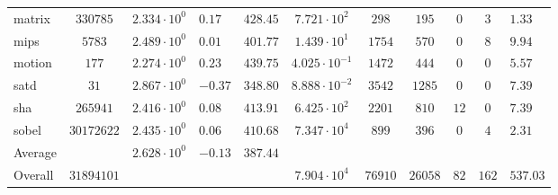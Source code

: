 \begin{tabular}{|l|c|HHc|c|c|c|c|cH|}
matrix        & $ 330785   $ & $ 2.334 \cdot 10^{0} $ & $ 0.17  $ & $ 428.45 $ & $ 7.721 \cdot 10^{2}  $ & $ 298   $ & $ 195   $ & $ 0   $ & $ 3   $ & $ 1.33    $ \\
mips          & $ 5783     $ & $ 2.489 \cdot 10^{0} $ & $ 0.01  $ & $ 401.77 $ & $ 1.439 \cdot 10^{1}  $ & $ 1754  $ & $ 570   $ & $ 0   $ & $ 8   $ & $ 9.94    $ \\
motion        & $ 177      $ & $ 2.274 \cdot 10^{0} $ & $ 0.23  $ & $ 439.75 $ & $ 4.025 \cdot 10^{-1} $ & $ 1472  $ & $ 444   $ & $ 0   $ & $ 0   $ & $ 5.57    $ \\
satd          & $ 31       $ & $ 2.867 \cdot 10^{0} $ & $ -0.37 $ & $ 348.80 $ & $ 8.888 \cdot 10^{-2} $ & $ 3542  $ & $ 1285  $ & $ 0   $ & $ 0   $ & $ 7.39    $ \\
sha           & $ 265941   $ & $ 2.416 \cdot 10^{0} $ & $ 0.08  $ & $ 413.91 $ & $ 6.425 \cdot 10^{2}  $ & $ 2201  $ & $ 810   $ & $ 12  $ & $ 0   $ & $ 7.39    $ \\
sobel         & $ 30172622 $ & $ 2.435 \cdot 10^{0} $ & $ 0.06  $ & $ 410.68 $ & $ 7.347 \cdot 10^{4}  $ & $ 899   $ & $ 396   $ & $ 0   $ & $ 4   $ & $ 2.31    $ \\
\hline
Average       & $          $ & $ 2.628 \cdot 10^{0} $ & $ -0.13 $ & $ 387.44 $ & $                     $ & $       $ & $       $ & $     $ & $     $ & $         $ \\
\hline
Overall       & $ 31894101 $ & $                    $ & $       $ & $        $ & $ 7.904 \cdot 10^{4}  $ & $ 76910 $ & $ 26058 $ & $ 82  $ & $ 162 $ & $ 537.03  $ \\
\hline
\end{tabular}
